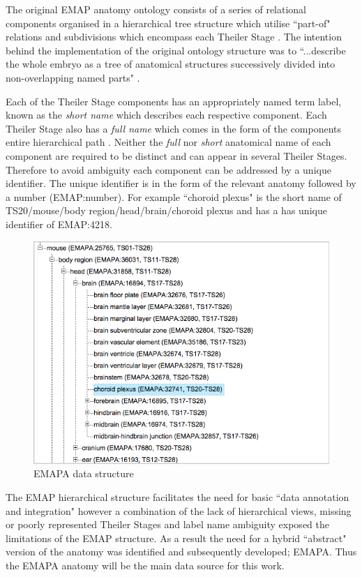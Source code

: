 The original EMAP anatomy ontology consists of a series of relational components organised in a hierarchical tree structure which utilise ``part-of" relations and subdivisions which encompass each Theiler Stage \cite{emap}. The intention behind the implementation of the original ontology structure was to ``...describe the whole embryo as a tree of anatomical structures successively divided into non-overlapping named parts" \cite{emap}.

Each of the Theiler Stage components has an appropriately named term label, known as the \textit{short name} which describes each respective component. Each Theiler Stage also has a \textit{full name} which comes in the form of the components entire hierarchical path \cite{emap}. Neither the \textit{full} nor \textit{short} anatomical name of each component are required to be distinct and can appear in several Theiler Stages. Therefore to avoid ambiguity each component can be addressed by a unique identifier. The unique identifier is in the form of the relevant anatomy followed by a number (EMAP:number). For example ``choroid plexus" is the short name of TS20/mouse/body region/head/brain/choroid plexus and has a has unique identifier of EMAP:4218. \begin{figure}[h]\begin{center}\includegraphics[width=1\linewidth]{images/emapachoroidplexus}\caption{EMAPA data structure}\label{fig:emapa}\end{center}\end{figure}

The EMAP hierarchical structure facilitates the need for basic ``data annotation and integration" however a combination of the lack of hierarchical views, missing or poorly represented Theiler Stages and label name ambiguity exposed the limitations of the EMAP structure. As a result the need for a hybrid ``abstract" version of the anatomy was identified and subsequently developed; EMAPA. \cite{emap} Thus the EMAPA anatomy will be the main data source for this work.

